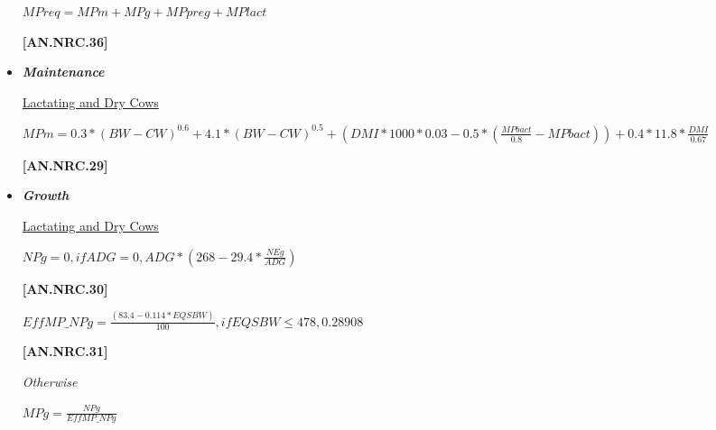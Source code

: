 \documentclass{article}
\begin{document}
\begin{refsection}
\begin{itemize}
\begin{center}
    \(MPreq = MPm + MPg + MPpreg + MPlact\)
\end{center}

\vspace{0.5cm}
            {\raggedleft \textbf{[AN.NRC.36]}\par}
        
                \item \textbf{\textit{Maintenance}}
        
        \vspace{0.2cm}
        \underline {Lactating and Dry Cows}
        \vspace{0.2cm}

\begin{center}
    \(MPm = 0.3 * (BW - CW)^{0.6} + 4.1 * (BW - CW)^{0.5} + (DMI * 1000 * 0.03 - 0.5 * (\frac{MPbact}{0.8} - MPbact)) + 0.4 * 11.8 * \frac{DMI}{0.67}\)
\end{center}

\vspace{0.5cm}
            {\raggedleft \textbf{[AN.NRC.29]}\par}
        
                \item \textbf{\textit{Growth}}
        \vspace{0.2cm}


        \underline {Lactating and Dry Cows}
        \vspace{0.2cm}

\begin{center}
    \(NPg = 0, if ADG = 0, ADG * (268 - 29.4 * \frac{NEg}{ADG})\)
\end{center}

\vspace{0.5cm}
            {\raggedleft \textbf{[AN.NRC.30]}\par}
        \vspace{0.2cm}

\begin{center}
    \(EffMP\_NPg = \frac{(83.4 - 0.114 * EQSBW)}{100}, if EQSBW \leq 478, 0
    .28908\)
\end{center}
\vspace{0.5cm}

            {\raggedleft \textbf{[AN.NRC.31]}\par}
\textit{\small Otherwise}
        \vspace{0.2cm}

\begin{center}
    \(MPg = \frac{NPg}{EffMP\_NPg}\)
\end{center}
\vspace{0.5cm}


\end{itemize}
\end{refsection}
\end{document}
